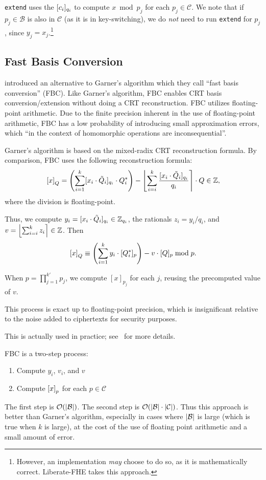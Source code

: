 \documentclass[../keyswitching.tex]{subfiles}
\begin{document}
\texttt{extend} uses the $\bracks{c_i}_{q_i}$ to compute $x \bmod p_j$ for each $p_j\in \mathcal{C}$. We note that if $p_j\in\mathcal{B}$ is also in $\mathcal{C}$ (as it is in key-switching), we do \emph{not} need to run \texttt{extend} for $p_j$, since $y_j=x_j$.\footnote{However, an implementation \emph{may} choose to do so, as it is mathematically correct. Liberate-FHE takes this approach.} 

\subsection{Fast Basis Conversion}
\label{sec:fastextension}
\cite{cryptoeprint:2018/117} introduced an alternative to Garner's algorithm which they call ``fast basis conversion'' (FBC). Like Garner's algorithm, FBC enables CRT basis conversion/extension without doing a CRT reconstruction. FBC utilizes floating-point arithmetic. Due to the finite precision inherent in the use of floating-point arithmetic, FBC has a low probability of introducing small approximation errors, which ``in the context of homomorphic operations are inconsequential''.

Garner's algorithm is based on the mixed-radix CRT reconstruction formula. By comparison, FBC uses the following reconstruction formula:
\[\bracks*{x}_Q = \parens*{\sum_{i=1}^k[x_i\cdot\tilde{Q}_i]_{q_i}\cdot Q_i^*}-\round*{\sum_{i=i}^k\frac{[x_i\cdot\tilde{Q}_i]_{q_i}}{q_i}}\cdot Q\in \Z,\]
where the division is floating-point.	

Thus, we compute $y_i=[x_i\cdot\tilde{Q}_i]_{q_i}\in \Z_{q_i}$, the rationals $z_i=y_i/q_i$, and $v=\round*{\sum_{i=i}^kz_i}\in\Z$. Then 
\[\bracks*{x}_Q \equiv \parens*{\sum_{i=1}^k y_i\cdot [Q_i^*]_p}-v\cdot [Q]_p\bmod p.\]

When $p=\prod_{j=1}^{k'} p_j$, we compute $[x]_{p_j}$ for each $j$, reusing the precomputed value of $v$.

This process is exact up to floating-point precision, which is insignificant relative to the noise added to ciphertexts for security purposes.

This is actually used in practice; see~\cite{cryptoeprint:2018/589} for more details.

FBC is a two-step process:
\begin{enumerate}
	\item Compute $y_i$, $v_i$, and $v$
	\item Compute $\bracks*{x}_p$ for each $p\in \mathcal{C}$
\end{enumerate}
The first step is $\mathcal{O}(\abs{\mathcal{B}})$. The second step is $\mathcal{O}(\abs{\mathcal{B}}\cdot \abs{\mathcal{C}})$. Thus this approach is better than Garner's algorithm, especially in cases where $\abs{\mathcal{B}}$ is large (which is true when $k$ is large), at the cost of the use of floating point arithmetic and a small amount of error.
\end{document}
